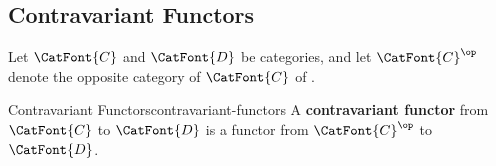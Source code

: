 \subsection{Contravariant Functors}\label{subsection-contravariant-functors}
Let $\CatFont{C}$ and $\CatFont{D}$ be categories, and let $\CatFont{C}^{\op}$ denote the opposite category of $\CatFont{C}$ of .
\begin{definition}{Contravariant Functors}{contravariant-functors}%
    A \textbf{contravariant functor} from $\CatFont{C}$ to $\CatFont{D}$ is a functor from $\CatFont{C}^{\op}$ to $\CatFont{D}$.
\end{definition}
